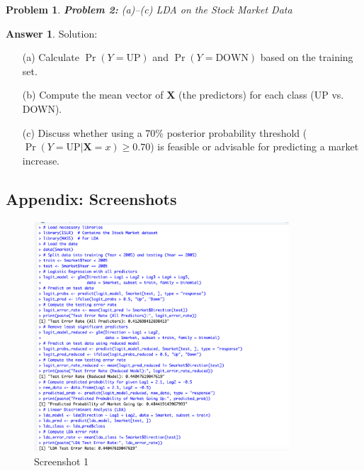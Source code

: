 \documentclass[12pt]{article}
\newtheorem{problem}{Problem} %
\theoremstyle{definition}
\newtheorem*{answer}{Answer}
\newcommand{\solution}{\textcolor{PineGreen}{Solution:\newline}}
\begin{document}
\setcounter{problem}{1}
\begin{problem}
\textbf{Problem 2:} (a)--(c) LDA on the Stock Market Data
\end{problem}

\begin{answer}
\solution
\begin{itemize}
    \item[(a)] Calculate \(\Pr(Y = \text{UP})\) and \(\Pr(Y = \text{DOWN})\) based on the training set.
    \item[(b)] Compute the mean vector of \(\mathbf{X}\) (the predictors) for each class (UP vs. DOWN).
    \item[(c)] Discuss whether using a 70\% posterior probability threshold (\(\Pr(Y=\text{UP}|\mathbf{X}=x) \ge 0.70\)) is feasible or advisable for predicting a market increase.
\end{itemize}
\end{answer}

\newpage

\subsection*{Appendix: Screenshots}

\begin{figure}[htbp]
    \centering
    \includegraphics[width=0.85\textwidth]{Screenshot_2025-03-02_at_3.56.05_PM.png}
    \caption{Screenshot 1}
    \label{fig:screenshot1}
\end{figure}
\end{document}
